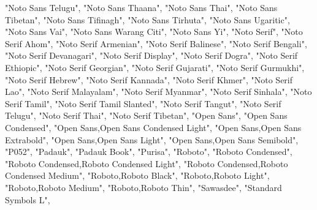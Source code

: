 \documentclass[
]{article}
\newenvironment{Shaded}{\begin{snugshade}}{\end{snugshade}}
\newcommand{\NormalTok}[1]{#1}
\newcommand{\StringTok}[1]{\textcolor[rgb]{0.31,0.60,0.02}{#1}}
\begin{document}
\begin{Shaded}
\begin{Highlighting}[]
  \StringTok{"Noto Sans Telugu"}\NormalTok{,}
  \StringTok{"Noto Sans Thaana"}\NormalTok{,}
  \StringTok{"Noto Sans Thai"}\NormalTok{,}
  \StringTok{"Noto Sans Tibetan"}\NormalTok{,}
  \StringTok{"Noto Sans Tifinagh"}\NormalTok{,}
  \StringTok{"Noto Sans Tirhuta"}\NormalTok{,}
  \StringTok{"Noto Sans Ugaritic"}\NormalTok{,}
  \StringTok{"Noto Sans Vai"}\NormalTok{,}
  \StringTok{"Noto Sans Warang Citi"}\NormalTok{,}
  \StringTok{"Noto Sans Yi"}\NormalTok{,}
  \StringTok{"Noto Serif"}\NormalTok{,}
  \StringTok{"Noto Serif Ahom"}\NormalTok{,}
  \StringTok{"Noto Serif Armenian"}\NormalTok{,}
  \StringTok{"Noto Serif Balinese"}\NormalTok{,}
  \StringTok{"Noto Serif Bengali"}\NormalTok{,}
  \StringTok{"Noto Serif Devanagari"}\NormalTok{,}
  \StringTok{"Noto Serif Display"}\NormalTok{,}
  \StringTok{"Noto Serif Dogra"}\NormalTok{,}
  \StringTok{"Noto Serif Ethiopic"}\NormalTok{,}
  \StringTok{"Noto Serif Georgian"}\NormalTok{,}
  \StringTok{"Noto Serif Gujarati"}\NormalTok{,}
  \StringTok{"Noto Serif Gurmukhi"}\NormalTok{,}
  \StringTok{"Noto Serif Hebrew"}\NormalTok{,}
  \StringTok{"Noto Serif Kannada"}\NormalTok{,}
  \StringTok{"Noto Serif Khmer"}\NormalTok{,}
  \StringTok{"Noto Serif Lao"}\NormalTok{,}
  \StringTok{"Noto Serif Malayalam"}\NormalTok{,}
  \StringTok{"Noto Serif Myanmar"}\NormalTok{,}
  \StringTok{"Noto Serif Sinhala"}\NormalTok{,}
  \StringTok{"Noto Serif Tamil"}\NormalTok{,}
  \StringTok{"Noto Serif Tamil Slanted"}\NormalTok{,}
  \StringTok{"Noto Serif Tangut"}\NormalTok{,}
  \StringTok{"Noto Serif Telugu"}\NormalTok{,}
  \StringTok{"Noto Serif Thai"}\NormalTok{,}
  \StringTok{"Noto Serif Tibetan"}\NormalTok{,}
  \StringTok{"Open Sans"}\NormalTok{,}
  \StringTok{"Open Sans Condensed"}\NormalTok{,}
  \StringTok{"Open Sans,Open Sans Condensed Light"}\NormalTok{,}
  \StringTok{"Open Sans,Open Sans Extrabold"}\NormalTok{,}
  \StringTok{"Open Sans,Open Sans Light"}\NormalTok{,}
  \StringTok{"Open Sans,Open Sans Semibold"}\NormalTok{,}
  \StringTok{"P052"}\NormalTok{,}
  \StringTok{"Padauk"}\NormalTok{,}
  \StringTok{"Padauk Book"}\NormalTok{,}
  \StringTok{"Purisa"}\NormalTok{,}
  \StringTok{"Roboto"}\NormalTok{,}
  \StringTok{"Roboto Condensed"}\NormalTok{,}
  \StringTok{"Roboto Condensed,Roboto Condensed Light"}\NormalTok{,}
  \StringTok{"Roboto Condensed,Roboto Condensed Medium"}\NormalTok{,}
  \StringTok{"Roboto,Roboto Black"}\NormalTok{,}
  \StringTok{"Roboto,Roboto Light"}\NormalTok{,}
  \StringTok{"Roboto,Roboto Medium"}\NormalTok{,}
  \StringTok{"Roboto,Roboto Thin"}\NormalTok{,}
  \StringTok{"Sawasdee"}\NormalTok{,}
  \StringTok{"Standard Symbols L"}\NormalTok{,}

\end{Highlighting}
\end{Shaded}
\end{document}
